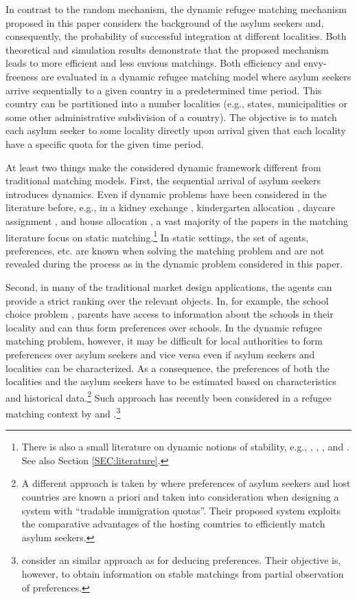 \documentclass[12pt,fleqn]{article}
\begin{document}
In contrast to the random mechanism, the dynamic refugee matching mechanism proposed in this paper considers the background of the asylum seekers and, consequently, the probability of successful integration at different localities. Both theoretical and simulation results demonstrate that the proposed mechanism leads to more efficient and less envious matchings. Both efficiency and envy-freeness are evaluated in a dynamic refugee matching model where asylum seekers arrive sequentially to a given country in a predetermined time period. This country can be partitioned into a number localities (e.g., states, municipalities or some other administrative subdivision of a country). The objective is to match each asylum seeker to some locality directly upon arrival given that each locality have a specific quota for the given time period. 

At least two things make the considered dynamic framework different from traditional matching models. First, the sequential arrival of asylum seekers introduces dynamics. Even if dynamic problems have been considered in the literature before, e.g., in a kidney exchange \citep{bib:Unver}, kindergarten allocation \citep{bib:KennesEtAl2014}, daycare assignment \citep{bib:KennesEtAl2014}, and house allocation \citep{bib:BlochCantala,bib:Kurino}, a vast majority of the papers in the matching literature focus on static matching.\footnote{There is also a small literature on dynamic notions of stability, e.g., \citet{bib:DamianoLam}, \citet{bib:Gudmundsson}, \citet{bib:KadamEtAl2018b}, and \citet{bib:Kurino}. See also Section \ref{SEC:literature}.} In static settings, the set of agents, preferences, etc. are known when solving the matching problem and are not revealed during the process as in the dynamic problem considered in this paper. 

Second, in many of the traditional market design applications, the agents can provide a strict ranking over the relevant objects. In, for example, the school choice problem \citep{bib:AbdulkadirougluSonmez}, parents have access to information about the schools in their locality and can thus form preferences over schools. In the dynamic refugee matching problem, however, it may be difficult for local authorities to form preferences over asylum seekers and vice versa even if asylum seekers and localities can be characterized. As a consequence, the preferences of both the localities and the asylum seekers have to be estimated based on characteristics and historical data.\footnote{A different approach is taken by \citet{bib:MoragaEtAl} where preferences of asylum seekers and host countries are known a priori and taken into consideration when designing a system with ``tradable immigration quotas''. Their proposed system exploits the comparative advantages of the hosting countries to efficiently match asylum seekers.} Such approach has recently been considered in a refugee matching context by \citet{bib:AnderssonEhlers} and \citet{bib:BansakEtAl}.\footnote{\citet{bib:HaeringerIehle} consider an similar approach as \citet{bib:AnderssonEhlers} for deducing preferences. Their objective is, however, to obtain information on stable matchings from partial observation of preferences.}
\end{document}
